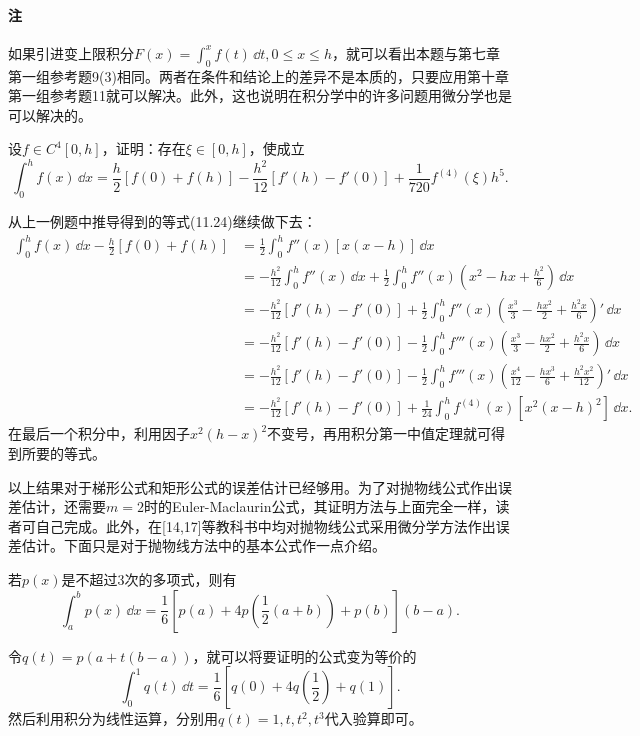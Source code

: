 \paragraph{注} 如果引进变上限积分$F(x)=\int_0^xf(t)\,\dd t,0\le x\le h$，就可以看出本题与第七章第一组参考题9(3)相同。两者在条件和结论上的差异不是本质的，只要应用第十章第一组参考题11就可以解决。此外，这也说明在积分学中的许多问题用微分学也是可以解决的。

\begin{xexample}[11.3.5]
设$f\in C^4[0,h]$，证明：存在$\xi\in[0,h]$，使成立
\begin{equation}
  \int_0^hf(x)\,\dd x=\frac h2[f(0)+f(h)]-\frac{h^2}{12}[f'(h)-f'(0)]+\frac1{720}f^{(4)}(\xi)h^5.
  \tag{11.25}
  \label{eq:11.25}
\end{equation}
\end{xexample}
\begin{xproof}
从上一例题中推导得到的等式(11.24)继续做下去：
\begin{align*}
\int_0^hf(x)\,\dd x-\frac h2[f(0)+f(h)]
&=\frac12\int_0^hf''(x)[x(x-h)]\,\dd x\\
&=-\frac{h^2}{12}\int_0^hf''(x)\,\dd x
 +\frac12\int_0^hf''(x)\left(x^2-hx+\frac{h^2}{6}\right)\,\dd x\\
&=-\frac{h^2}{12}[f'(h)-f'(0)]
 +\frac12\int_0^hf''(x)\left(\frac{x^3}{3}-\frac{hx^2}{2}+\frac{h^2x}{6}\right)'\,\dd x\\
&=-\frac{h^2}{12}[f'(h)-f'(0)]
 -\frac12\int_0^hf'''(x)\left(\frac{x^3}{3}-\frac{hx^2}{2}+\frac{h^2x}{6}\right)\,\dd x\\
&=-\frac{h^2}{12}[f'(h)-f'(0)]
 -\frac12\int_0^hf'''(x)\left(\frac{x^4}{12}-\frac{hx^3}{6}+\frac{h^2x^2}{12}\right)'\,\dd x\\
&=-\frac{h^2}{12}[f'(h)-f'(0)]
 +\frac1{24}\int_0^hf^{(4)}(x)[x^2(x-h)^2]\,\dd x.
\end{align*}
在最后一个积分中，利用因子$x^2(h-x)^2$不变号，再用积分第一中值定理就可得到所要的等式。
\end{xproof}

以上结果对于梯形公式和矩形公式的误差估计已经够用。为了对抛物线公式作出误差估计，还需要$m=2$时的Euler-Maclaurin公式，其证明方法与上面完全一样，读者可自己完成。此外，在[14,17]等教科书中均对抛物线公式采用微分学方法作出误差估计。下面只是对于抛物线方法中的基本公式作一点介绍。

\begin{xexample}[11.3.6（万能公式）]
若$p(x)$是不超过3次的多项式，则有
\begin{equation}
  \int_a^bp(x)\,\dd x=\frac16\left[p(a)+4p\left(\frac12(a+b)\right)+p(b)\right](b-a).
  \tag{11.26}
  \label{eq:11.26}
\end{equation}
\end{xexample}
\begin{xproof}
令$q(t)=p(a+t(b-a))$，就可以将要证明的公式变为等价的
\[
  \int_0^1q(t)\,\dd t=\frac16\left[q(0)+4q\left(\frac12\right)+q(1)\right].
\]
然后利用积分为线性运算，分别用$q(t)=1,t,t^2,t^3$代入验算即可。
\end{xproof}

